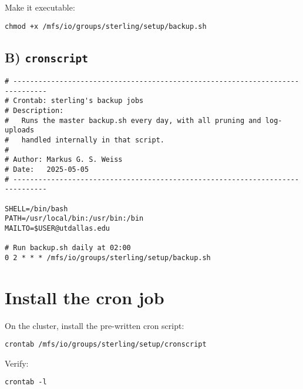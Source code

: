 \documentclass[12pt,letterpaper]{article}
\begin{document}
Make it executable:
\begin{lstlisting}[style=custombash]
chmod +x /mfs/io/groups/sterling/setup/backup.sh
\end{lstlisting}

\subsection{B) \texttt{cronscript}}
\begin{lstlisting}[style=custombash]
# ------------------------------------------------------------------------------
# Crontab: sterling's backup jobs
# Description:
#   Runs the master backup.sh every day, with all pruning and log-uploads
#   handled internally in that script.
#
# Author: Markus G. S. Weiss
# Date:   2025-05-05
# ------------------------------------------------------------------------------

SHELL=/bin/bash
PATH=/usr/local/bin:/usr/bin:/bin
MAILTO=$USER@utdallas.edu

# Run backup.sh daily at 02:00
0 2 * * * /mfs/io/groups/sterling/setup/backup.sh
\end{lstlisting}

\section{Install the cron job}
\label{sec:install-cron}
On the cluster, install the pre-written cron script:
\begin{lstlisting}[style=custombash]
crontab /mfs/io/groups/sterling/setup/cronscript
\end{lstlisting}
Verify:
\begin{lstlisting}[style=custombash]
crontab -l
\end{lstlisting}
\end{document}
